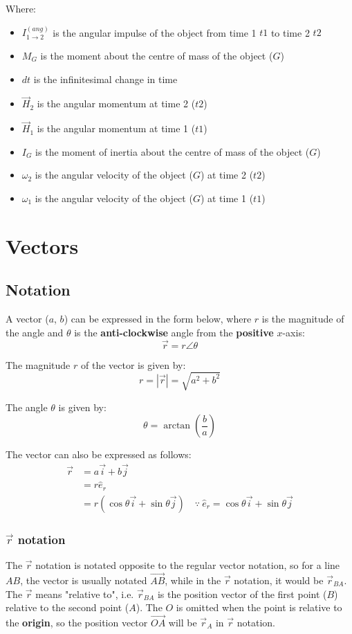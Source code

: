 \documentclass[11pt]{article}
\begin{document}
Where:
\begin{itemize}
\item \(I_{1 \rightarrow 2}^{(ang)}\) is the angular impulse of the object from time 1 \(t1\) to time 2 \(t2\)
\item \(M_G\) is the moment about the centre of mass of the object (\(G\))
\item \(dt\) is the infinitesimal change in time
\item \(\vec{H}_2\) is the angular momentum at time 2 (\(t2\))
\item \(\vec{H}_1\) is the angular momentum at time 1 (\(t1\))
\item \(I_G\) is the moment of inertia about the centre of mass of the object (\(G\))
\item \(\omega_{2}\) is the angular velocity of the object (\(G\)) at time 2 (\(t2\))
\item \(\omega_{1}\) is the angular velocity of the object (\(G\)) at time 1 (\(t1\))
\end{itemize}

 \newpage
\section{Vectors}
\label{sec:orgd0e31ad}

\subsection{Notation}
\label{sec:org0f0f0e3}
A vector (\(a\), \(b\)) can be expressed in the form below, where \(r\) is the magnitude of the angle and \(\theta\) is the \textbf{anti-clockwise} angle from the \textbf{positive} \(x\)-axis:
\[\vec{r} = r \angle \theta\]

The magnitude \(r\) of the vector is given by:
\[r = \left| \vec{r} \right| = \sqrt{a^2 + b^2}\]

The angle \(\theta\) is given by:
\[\theta = \arctan \left( \frac{b}{a} \right)\]

The vector can also be expressed as follows:
\begin{align*}
\vec{r} &= a \vec{i} + b \vec{j} \\
&= r \hat{e}_r \\
&= r \left( \cos \theta \vec{i} + \sin \theta \vec{j} \right) \quad \because \ \hat{e}_r = \cos \theta \vec{i} + \sin \theta \vec{j}
\end{align*}
\subsubsection{\(\vec{r}\) notation}
\label{sec:org647be44}
The \(\vec{r}\) notation is notated opposite to the regular vector notation, so for a line \(AB\), the vector is usually notated \(\overrightarrow{AB}\), while in the \(\vec{r}\) notation, it would be \(\vec{r}_{BA}\). The \(\vec{r}\) means "relative to", i.e. \(\vec{r}_{BA}\) is the position vector of the first point (\(B\)) relative to the second point (\(A\)). The \(O\) is omitted when the point is relative to the \textbf{origin}, so the position vector \(\overrightarrow{OA}\) will be \(\vec{r}_A\) in \(\vec{r}\) notation.
\end{document}
